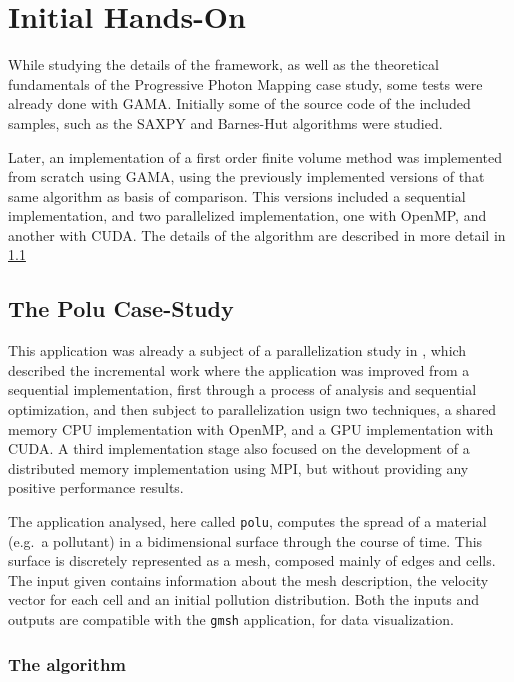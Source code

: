 \documentclass[main.tex]{subfiles}
\begin{document}
\section{Initial Hands-On}

While studying the details of the framework, as well as the theoretical fundamentals of the Progressive Photon Mapping case study, some tests were already done with \acs{GAMA}. Initially some of the source code of the included samples, such as the SAXPY and Barnes-Hut algorithms were studied.

Later, an implementation of a first order finite volume method was implemented from scratch using GAMA, using the previously implemented versions of that same algorithm as basis of comparison. This versions included a sequential implementation, and two parallelized implementation, one with \acs{OpenMP}, and another with \acs{CUDA}. The details of the algorithm are described in more detail in \cref{sec:polu}

\subsection{The Polu Case-Study} \label{sec:polu}

This application was already a subject of a parallelization study in \cite{naps2012}, which described the incremental work where the application was improved from a sequential implementation, first through a process of analysis and sequential optimization, and then subject to parallelization usign two techniques, a shared memory \acs{CPU} implementation with \acs{OpenMP}, and a \acs{GPU} implementation with \acs{CUDA}. A third implementation stage also focused on the development of a distributed memory implementation using \acs{MPI}, but without providing any positive performance results.

The application analysed, here called \texttt{polu}, computes the spread of a material (e.g.\ a pollutant) in a bidimensional surface through the course of time. This surface is discretely represented as a mesh, composed mainly of edges and cells. The input given contains information about the mesh description, the velocity vector for each cell and an initial pollution distribution.
Both the inputs and outputs are compatible with the \texttt{gmsh} application, for data visualization.

\subsubsection{The algorithm}
\end{document}
